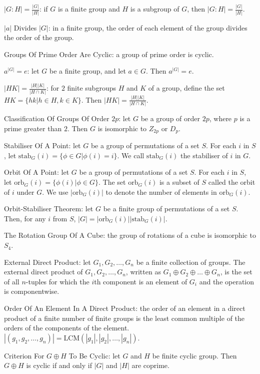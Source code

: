 $|G:H| = \frac{|G|}{|H|}$: if $G$ is a finite group and $H$ is a subgroup of $G$, then $|G:H| = \frac{|G|}{|H|}$.

$|a|$ Divides $|G|$: in a finite group, the order of each element of the group divides the order of the group.

Groups Of Prime Order Are Cyclic: a group of prime order is cyclic.

$a^{|G|}=e$: let $G$ be a finite group, and let $a \in G$. Then $a^{|G|}=e$.

$|HK|=\frac{|H| |K|}{|H \cap K|}$: for $2$ finite subgroups $H$ and $K$ of a group, define the set $HK = \{hk | h \in H,k \in K \}$. Then $|HK|=\frac{|H| |K|}{|H \cap K|}$.

Classification Of Groups Of Order $2p$: let $G$ be a group of order $2p$, where $p$ is a prime greater than $2$. Then $G$ is isomorphic to $Z_{2p}$ or $D_p$.

Stabiliser Of A Point: let $G$ be a group of permutations of a set $S$. For each $i$ in $S$, let $\text{stab}_G (i) = \{\phi \in G | \phi (i)=i \}$. We call $\text{stab}_G (i)$ the stabiliser of $i$ in $G$.

Orbit Of A Point: let $G$ be a group of permutations of a set $S$. For each $i$ in $S$, let $\text{orb}_G (i) = \{\phi (i) | \phi \in G \}$. The set $\text{orb}_G (i)$ is a subset of $S$ called the orbit of $i$ under $G$. We use $|\text{orb}_G (i)|$ to denote the number of elements in $\text{orb}_G (i)$.

Orbit-Stabiliser Theorem: let $G$ be a finite group of permutations of a set $S$. Then, for any $i$ from $S$, $|G|=|\text{orb}_G (i)||\text{stab}_G (i)|$.

The Rotation Group Of A Cube: the group of rotations of a cube is isomorphic to $S_4$.

External Direct Product: let $G_1,G_2,\dots,G_n$ be a finite collection of groups. The external direct product of $G_1,G_2,\dots,G_n$, written as $G_1 \oplus G_2 \oplus \dots \oplus G_n$, is the set of all $n$-tuples for which the $i$th component is an element of $G_i$ and the operation is componentwise.

Order Of An Element In A Direct Product: the order of an element in a direct product of a finite number of finite groups is the least common multiple of the orders of the components of the element. $|(g_1,g_2,\dots,g_n)|=\text{LCM}(|g_1|,|g_2|,\dots,|g_n|)$.

Criterion For $G \oplus H$ To Be Cyclic: let $G$ and $H$ be finite cyclic group. Then $G \oplus H$ is cyclic if and only if $|G|$ and $|H|$ are coprime.

